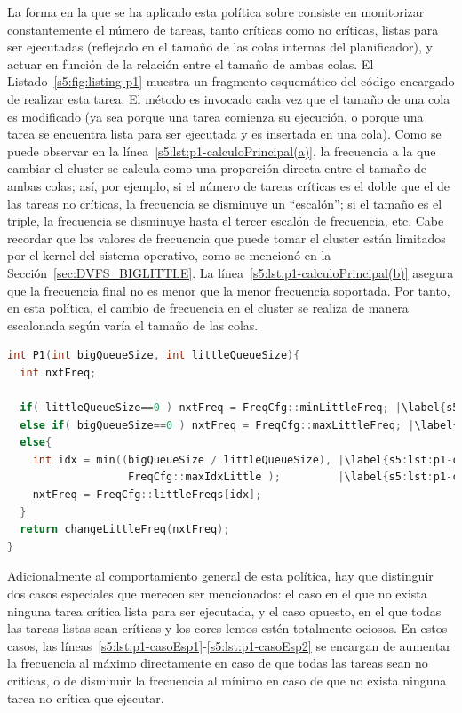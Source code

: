La forma en la que se ha aplicado esta política sobre \botlev consiste en
monitorizar constantemente el número de tareas, tanto críticas como no
críticas, listas para ser ejecutadas (reflejado en el tamaño de las colas
internas del planificador), y actuar en función de la relación entre el
tamaño de ambas colas. El Listado~\ref{s5:fig:listing-p1} muestra un
fragmento esquemático del código encargado de realizar esta tarea. El
método es invocado cada vez que el tamaño de una cola es modificado (ya sea
porque una tarea comienza su ejecución, o porque una tarea se encuentra
lista para ser ejecutada y es insertada en una cola). Como se puede
observar en la línea~\ref{s5:lst:p1-calculoPrincipal(a)}, la frecuencia a
la que cambiar el cluster se calcula como una proporción directa entre el
tamaño de ambas colas; así, por ejemplo, si el número de tareas críticas es
el doble que el de las tareas no críticas, la frecuencia se disminuye un
``escalón''; si el tamaño es el triple, la frecuencia se disminuye hasta el
tercer escalón de frecuencia, etc. Cabe recordar que los valores de
frecuencia que puede tomar el cluster están limitados por el kernel del
sistema operativo, como se mencionó en la
Sección~\ref{sec:DVFS_BIGLITTLE}. La
línea~\ref{s5:lst:p1-calculoPrincipal(b)} asegura que la frecuencia final
no es menor que la menor frecuencia soportada. Por tanto, en esta política,
el cambio de frecuencia en el cluster se realiza de manera escalonada según
varía el tamaño de las colas.

\begin{lstlisting}[float,language=C++,caption={Fragmento de código esquemático para la política P1.}, label={s5:fig:listing-p1}]
int P1(int bigQueueSize, int littleQueueSize){
  int nxtFreq;
      
  if( littleQueueSize==0 ) nxtFreq = FreqCfg::minLittleFreq; |\label{s5:lst:p1-casoEsp1}|
  else if( bigQueueSize==0 ) nxtFreq = FreqCfg::maxLittleFreq; |\label{s5:lst:p1-casoEsp2}|
  else{
    int idx = min((bigQueueSize / littleQueueSize), |\label{s5:lst:p1-calculoPrincipal(a)}|
                   FreqCfg::maxIdxLittle );         |\label{s5:lst:p1-calculoPrincipal(b)}|
    nxtFreq = FreqCfg::littleFreqs[idx];
  }
  return changeLittleFreq(nxtFreq);
}
\end{lstlisting}

Adicionalmente al comportamiento general de esta política, hay que
distinguir dos casos especiales que merecen ser mencionados: el caso en el
que no exista ninguna tarea crítica lista para ser ejecutada, y el caso
opuesto, en el que todas las tareas listas sean críticas y los cores lentos
estén totalmente ociosos. En estos casos, las
líneas~\ref{s5:lst:p1-casoEsp1}-\ref{s5:lst:p1-casoEsp2} se encargan de
aumentar la frecuencia al máximo directamente en caso de que todas las
tareas sean no críticas, o de disminuir la frecuencia al mínimo en caso de
que no exista ninguna tarea no crítica que ejecutar.

